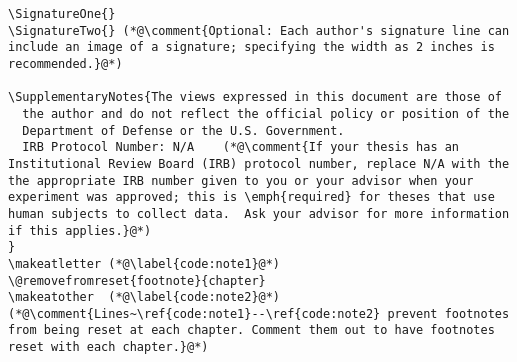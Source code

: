 \begin{lstlisting}
\SignatureOne{}
\SignatureTwo{} (*@\comment{Optional: Each author's signature line can include an image of a signature; specifying the width as 2 inches is recommended.}@*)

\SupplementaryNotes{The views expressed in this document are those of
  the author and do not reflect the official policy or position of the
  Department of Defense or the U.S. Government.
  IRB Protocol Number: N/A    (*@\comment{If your thesis has an Institutional Review Board (IRB) protocol number, replace N/A with the the appropriate IRB number given to you or your advisor when your experiment was approved; this is \emph{required} for theses that use human subjects to collect data.  Ask your advisor for more information if this applies.}@*)
}
\makeatletter (*@\label{code:note1}@*)
\@removefromreset{footnote}{chapter} 
\makeatother  (*@\label{code:note2}@*) (*@\comment{Lines~\ref{code:note1}--\ref{code:note2} prevent footnotes from being reset at each chapter. Comment them out to have footnotes reset with each chapter.}@*)
\end{lstlisting}


